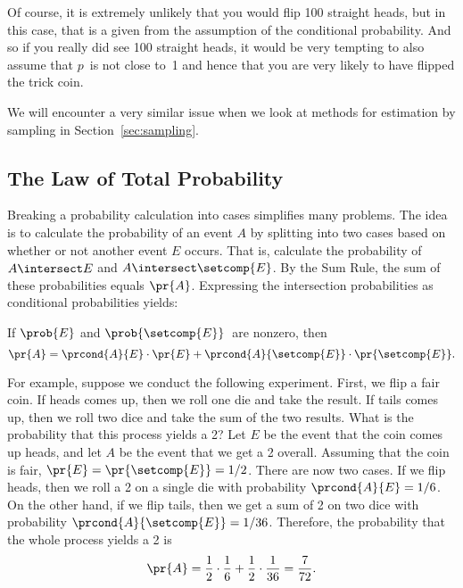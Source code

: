 Of course, it is extremely unlikely that you would flip 100 straight
heads, but in this case, that is a given from the assumption of the
conditional probability.  And so if you really did see 100 straight
heads, it would be very tempting to also assume that $p$~is not close
to~1 and hence that you are very likely to have flipped the trick
coin.

We will encounter a very similar issue when we look at methods for
estimation by sampling in Section~\ref{sec:sampling}.
\fi


\subsection{The Law of Total Probability}\label{sec:total_probability}

Breaking a probability calculation into cases simplifies many
problems.  The idea is to calculate the probability of an event $A$ by
splitting into two cases based on whether or not another event $E$
occurs.  That is, calculate the probability of $A\nobreak
\intersect\nobreak E$ and $A \intersect \setcomp{E}$.  By the Sum
Rule, the sum of these probabilities equals $\pr{A}$.  Expressing the
intersection probabilities as conditional probabilities yields:
\begin{rul}\label{total_prob_Ebar}
If $\prob{E}$ and $\prob{\setcomp{E}}$~are nonzero, then
\[
\pr{A} = \prcond{A}{E} \cdot \pr{E} +
         \prcond{A}{\setcomp{E}} \cdot \pr{\setcomp{E}}.
\]
\end{rul}

For example, suppose we conduct the following experiment.  First, we
flip a fair coin.  If heads comes up, then we roll one die and take the
result.  If tails comes up, then we roll two dice and take the sum of
the two results.  What is the probability that this process yields a
2?  Let $E$ be the event that the coin comes up heads, and let $A$ be
the event that we get a 2 overall.  Assuming that the coin is fair,
$\pr{E} = \pr{\setcomp{E}} = 1/2$.  There are now two cases. If we
flip heads, then we roll a 2 on a single die with probability
$\prcond{A}{E} = 1/6$.  On the other hand, if we flip tails, then we
get a sum of 2 on two dice with probability
$\prcond{A}{\setcomp{E}} = 1/36$.  Therefore, the probability that
the whole process yields a 2 is
\[
\pr{A} = \frac{1}{2} \cdot \frac{1}{6} + \frac{1}{2} \cdot \frac{1}{36} =
  \frac{7}{72}.
\]

